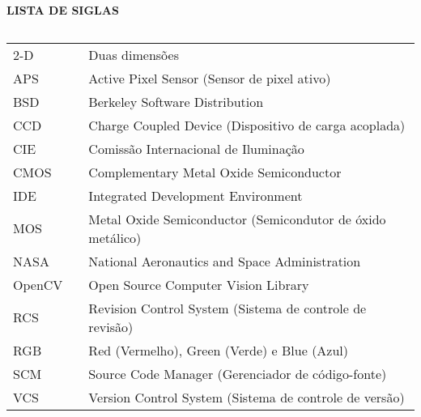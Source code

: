 \newpage

\begin{center}
\textbf{LISTA DE SIGLAS}
\end{center}
$\!$\\

\begin{tabular}{lll}
2-D & \hspace{1cm} & Duas dimensões \\

APS & \hspace{1cm} & Active Pixel Sensor (Sensor de pixel ativo) \\

BSD & \hspace{1cm} & Berkeley Software Distribution \\

CCD & \hspace{1cm} & Charge Coupled Device (Dispositivo de carga acoplada) \\

CIE & \hspace{1cm} & Comissão Internacional de Iluminação \\

CMOS & \hspace{1cm} & Complementary Metal Oxide Semiconductor \\

IDE & \hspace{1cm} & Integrated Development Environment \\

MOS & \hspace{1cm} & Metal Oxide Semiconductor (Semicondutor de óxido metálico) \\

NASA & \hspace{1cm} & National Aeronautics and Space Administration \\

OpenCV & \hspace{1cm} & Open Source Computer Vision Library \\

RCS & \hspace{1cm} & Revision Control System (Sistema de controle de revisão) \\

RGB & \hspace{1cm} & Red (Vermelho), Green (Verde) e Blue (Azul) \\

SCM & \hspace{1cm} & Source Code Manager (Gerenciador de código-fonte) \\

VCS & \hspace{1cm} & Version Control System (Sistema de controle de versão) \\

\end{tabular}